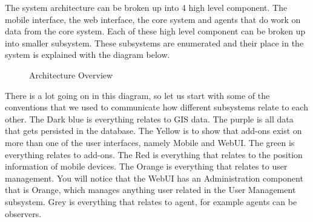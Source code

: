 The system architecture can be broken up into 4 high level component. The mobile interface, the web interface, the core system and agents that do work on data from the core system. Each of these high level component can be broken up into smaller subsystem. These subsystems are enumerated and their place in the system is explained with the diagram below.

\begin{figure}[h]
\caption{Architecture Overview}
\end{figure}
There is a lot going on in this diagram, so let us start with some of the conventions that we used to communicate how different subsystems relate to each other. The Dark blue is everything relates to GIS data. The purple is all data that gets persisted in the database. The Yellow is to show that add-ons exist on more than one of the user interfaces, namely Mobile and WebUI. The green is everything relates to add-ons. The Red is everything that relates to the position information of mobile devices. The Orange is everything that relates to user management. You will notice that the WebUI has an Administration component that is Orange, which manages anything user related in the User Management subsystem. Grey is everything that relates to agent, for example agents can be observers.\par
\bigskip
\noindent
